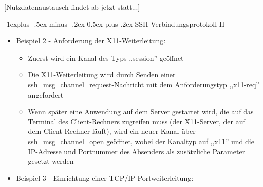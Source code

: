 \documentclass[a4paper]{article}
\makeatletter
\renewcommand{\subsection}{\@startsection{subsection}{2}{0mm}%
 {-1explus -.5ex minus -.2ex}%
 {0.5ex plus .2ex}%
 {\normalfont\normalsize\bfseries}}
\makeatother
\begin{document}
\begin{multicols}{3}
\begin{itemize}
\begin{itemize}
                        {[}Nutzdatenaustausch findet ab jetzt statt...{]}
              \end{itemize}
    \end{itemize}


    \subsection{SSH-Verbindungsprotokoll
        II}

    \begin{itemize}
        \item
              Beispiel 2 - Anforderung der X11-Weiterleitung:

              \begin{itemize}
                  \item
                        Zuerst wird ein Kanal des Typs ,,session'' geöffnet
                  \item
                        Die X11-Weiterleitung wird durch Senden einer
                        ssh\_msg\_channel\_request-Nachricht mit dem Anforderungstyp
                        ,,x11-req'' angefordert
                  \item
                        Wenn später eine Anwendung auf dem Server gestartet wird, die auf
                        das Terminal des Client-Rechners zugreifen muss (der X11-Server, der
                        auf dem Client-Rechner läuft), wird ein neuer Kanal über
                        ssh\_msg\_channel\_open geöffnet, wobei der Kanaltyp auf ,,x11'' und
                        die IP-Adresse und Portnummer des Absenders als zusätzliche
                        Parameter gesetzt werden
              \end{itemize}
        \item
              Beispiel 3 - Einrichtung einer TCP/IP-Portweiterleitung:


\end{itemize}
\end{multicols}
\end{document}

